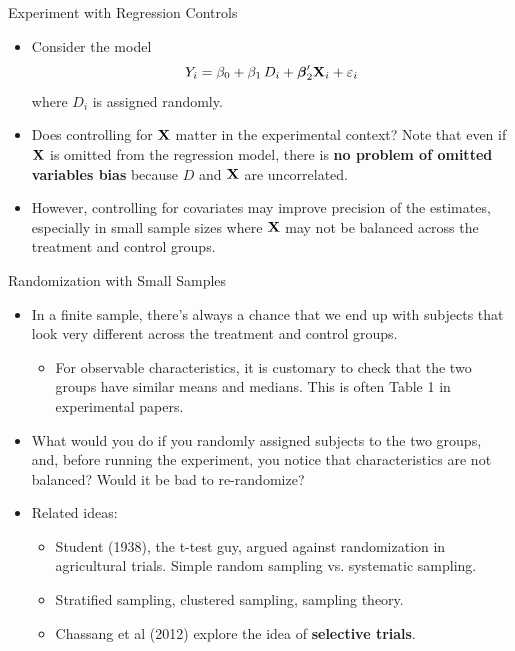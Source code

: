 \documentclass[aspectratio=169,11pt]{beamer}
\begin{document}
\begin{frame}{Experiment with Regression Controls}
\begin{itemize}
  \item Consider the model \[
  Y_{i}=\beta_{0}+\beta_{1}\, D_{i}+\boldsymbol{\beta}_2' {\bf X}_i + \varepsilon_{i}
  \]
  where $D_i$ is assigned randomly.

  \medskip
  \item Does controlling for ${\bf X}$ matter in the experimental context? Note that
  even if ${\bf X}$  is omitted from the regression model, there is {\bf no problem of
  omitted variables bias} because $D$ and ${\bf X}$ are uncorrelated.

  \medskip
  \item However, controlling for covariates may improve precision of the estimates,
  especially in small sample sizes where ${\bf X}$ may not be balanced across the treatment
  and control groups.

\end{itemize}
\end{frame}

\begin{frame}{Randomization with Small Samples}
\begin{itemize}
  \item In a finite sample, there's always
  a chance that we end up with subjects that look very different
  across the treatment and control groups.
  \begin{itemize}
    \item For observable characteristics, it is customary to check that
    the two groups have similar means and medians. This is often
    Table 1 in experimental papers.
  \end{itemize}

  \smallskip
  \item What would you do if you randomly assigned subjects to the two groups,
  and, before running the experiment, you notice that characteristics are not
  balanced? Would it be bad to re-randomize?

  \smallskip
  \item Related ideas:
  \begin{itemize}
    \item Student (1938), the t-test guy, argued against randomization in agricultural trials.
    Simple random sampling vs. systematic sampling.
    \item Stratified sampling, clustered sampling, sampling theory.
    \item Chassang et al (2012) explore the idea of {\bf selective trials}.
  \end{itemize}

\end{itemize}
\end{frame}
\end{document}
